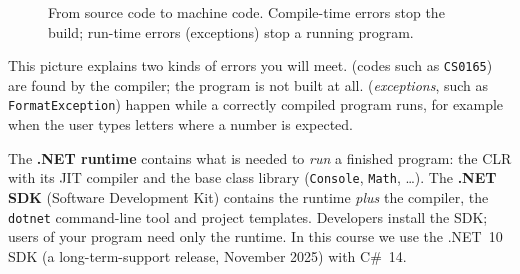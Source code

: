 \begin{figure}[h]\centering
{}
\caption{From source code to machine code. Compile-time errors stop the build; run-time errors (exceptions) stop a running program.}\label{fig:pipeline}
\end{figure}

This picture explains two kinds of errors you will meet.  (codes such as \texttt{CS0165}) are found by the compiler; the program is not built at all.  (\emph{exceptions}, such as \texttt{FormatException}) happen while a correctly compiled program runs, for example when the user types letters where a number is expected.

\begin{defbox}
The \textbf{.NET runtime} contains what is needed to \emph{run} a finished program: the CLR with its JIT compiler and the base class library (\texttt{Console}, \texttt{Math}, \dots). The \textbf{.NET SDK} (Software Development Kit) contains the runtime \emph{plus} the compiler, the \texttt{dotnet} command-line tool and project templates. Developers install the SDK; users of your program need only the runtime. In this course we use the .NET~10 SDK (a long-term-support release, November 2025) with C\#~14.
\end{defbox}

